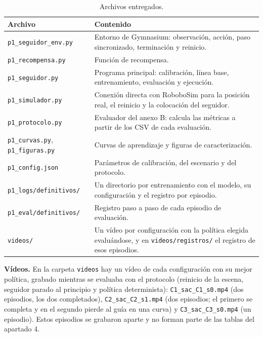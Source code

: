 \documentclass[11pt,a4paper]{article}
\newcommand{\cod}[1]{\texttt{\small #1}}
\begin{document}
\begin{table}[h]
\centering\small
\caption{Archivos entregados.}
\label{tab:archivos}
\begin{tabularx}{\linewidth}{@{}lY@{}}
\toprule
Archivo & Contenido \\
\midrule
\cod{p1\_seguidor\_env.py} & Entorno de Gymnasium: observación, acción, paso sincronizado, terminación y reinicio. \\
\cod{p1\_recompensa.py} & Función de recompensa. \\
\cod{p1\_seguidor.py} & Programa principal: calibración, línea base, entrenamiento, evaluación y ejecución. \\
\cod{p1\_simulador.py} & Conexión directa con RoboboSim para la posición real, el reinicio y la colocación del seguidor. \\
\cod{p1\_protocolo.py} & Evaluador del anexo B: calcula las métricas a partir de los CSV de cada evaluación. \\
\cod{p1\_curvas.py}, \cod{p1\_figuras.py} & Curvas de aprendizaje y figuras de caracterización. \\
\cod{p1\_config.json} & Parámetros de calibración, del escenario y del protocolo. \\
\cod{p1\_logs/definitivos/} & Un directorio por entrenamiento con el modelo, su configuración y el registro por episodio. \\
\cod{p1\_eval/definitivos/} & Registro paso a paso de cada episodio de evaluación. \\
\cod{videos/} & Un vídeo por configuración con la política elegida evaluándose, y en \cod{videos/registros/} el registro de esos episodios. \\
\bottomrule
\end{tabularx}
\end{table}

\textbf{Vídeos.} En la carpeta \cod{videos} hay un vídeo de cada configuración con su mejor política, grabado
mientras se evaluaba con el protocolo (reinicio de la escena, seguidor parado al principio y política
determinista): \cod{C1\_sac\_C1\_s0.mp4} (dos episodios, los dos completados), \cod{C2\_sac\_C2\_s1.mp4} (dos
episodios; el primero se completa y en el segundo pierde al guía en una curva) y \cod{C3\_sac\_C3\_s0.mp4} (un
episodio). Estos episodios se grabaron aparte y no forman parte de las tablas del apartado 4.
\end{document}

